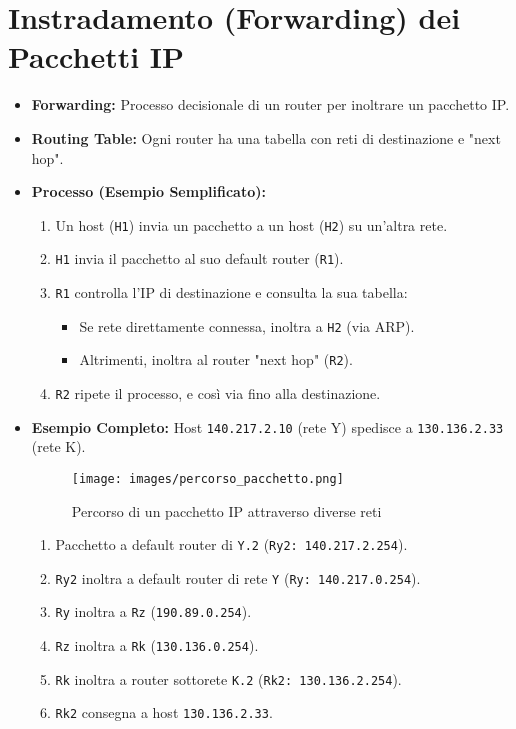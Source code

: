 \section{Instradamento (Forwarding) dei Pacchetti IP}
\begin{itemize}
    \item \textbf{Forwarding:} Processo decisionale di un router per inoltrare un pacchetto IP.
    \item \textbf{Routing Table:} Ogni router ha una tabella con reti di destinazione e "next hop".
    \item \textbf{Processo (Esempio Semplificato):}
    \begin{enumerate}
        \item Un host (\texttt{H1}) invia un pacchetto a un host (\texttt{H2}) su un'altra rete.
        \item \texttt{H1} invia il pacchetto al suo default router (\texttt{R1}).
        \item \texttt{R1} controlla l'IP di destinazione e consulta la sua tabella:
        \begin{itemize}
            \item Se rete direttamente connessa, inoltra a \texttt{H2} (via ARP).
            \item Altrimenti, inoltra al router "next hop" (\texttt{R2}).
        \end{itemize}
        \item \texttt{R2} ripete il processo, e così via fino alla destinazione.
    \end{enumerate}
    \item \textbf{Esempio Completo:} Host \texttt{140.217.2.10} (rete Y) spedisce a \texttt{130.136.2.33} (rete K).
    
    \begin{figure}[H]
        \centering
        \texttt{[image: images/percorso\_pacchetto.png]}
        \caption{Percorso di un pacchetto IP attraverso diverse reti}
    \end{figure}
    
    \begin{enumerate}
        \item Pacchetto a default router di \texttt{Y.2} (\texttt{Ry2: 140.217.2.254}).
        \item \texttt{Ry2} inoltra a default router di rete \texttt{Y} (\texttt{Ry: 140.217.0.254}).
        \item \texttt{Ry} inoltra a \texttt{Rz} (\texttt{190.89.0.254}).
        \item \texttt{Rz} inoltra a \texttt{Rk} (\texttt{130.136.0.254}).
        \item \texttt{Rk} inoltra a router sottorete \texttt{K.2} (\texttt{Rk2: 130.136.2.254}).
        \item \texttt{Rk2} consegna a host \texttt{130.136.2.33}.
    \end{enumerate}
\end{itemize}


